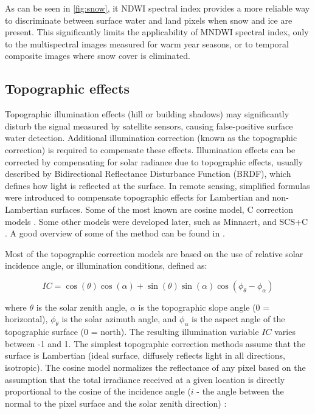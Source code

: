 As can be seen in \ref{fig:snow}, it NDWI spectral index provides a more reliable way to discriminate between surface water and land pixels when snow and ice are present. This significantly limits the applicability of MNDWI spectral index, only to the multispectral images measured for warm year seasons, or to temporal composite images where snow cover is eliminated.

\subsection{Topographic effects}

Topographic illumination effects (hill or building shadows) may significantly disturb the signal measured by satellite sensors, causing false-positive surface water detection. Additional illumination correction (known as the topographic correction) is required to compensate these effects. Illumination effects can be corrected by compensating for solar radiance due to topographic effects, usually described by Bidirectional Reflectance Disturbance Function (BRDF), which defines how light is reflected at the surface. In remote sensing, simplified formulas were introduced to compensate topographic effects for Lambertian and non-Lambertian surfaces. Some of the most known are cosine model, C correction models \citep{teillet1982slope}. Some other models were developed later, such as Minnaert, and SCS+C \citep{smith1980lambertian, teillet1982slope}. A good overview of some of the method can be found in \citep{gao2009simple, soenen2005scs+}. 

Most of the topographic correction models are based on the use of relative solar incidence angle, or illumination conditions, defined as:

\begin{equation}
\label{eq:ic}
IC = \cos(\theta) \cos(\alpha) + \sin(\theta) \sin(\alpha) \cos(\phi_{\theta} - \phi_{\alpha})
\end{equation}

where $\theta$ is the solar zenith angle, $\alpha$ is the topographic slope angle (0 = horizontal), $\phi_{\theta}$ is the solar azimuth angle, and $\phi_{\alpha}$ is the aspect angle of the topographic surface (0 = north). The resulting illumination variable $IC$ varies between -1 and 1. The simplest topographic correction methods assume that the surface is Lambertian (ideal surface, diffusely reflects light in all directions, isotropic). The cosine model normalizes the reflectance of any pixel based on the assumption that the total irradiance received at a given location is directly proportional to the cosine of the incidence angle ($i$ - the angle between the normal to the pixel surface and the solar zenith direction) \citep{teillet1982slope}:

